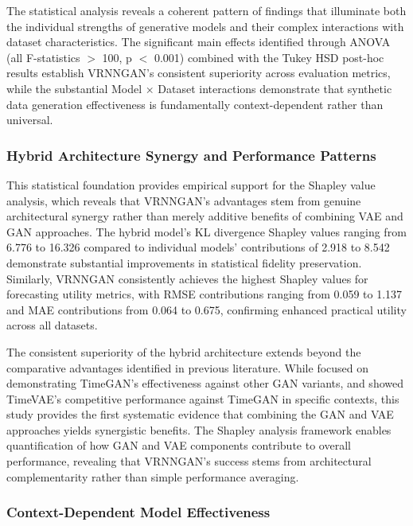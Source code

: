 \documentclass{article}
\begin{document}
The statistical analysis reveals a coherent pattern of findings that illuminate both the individual strengths of generative models and their complex interactions with dataset characteristics. The significant main effects identified through ANOVA (all F-statistics $>$ 100, p $<$ 0.001) combined with the Tukey HSD post-hoc results establish VRNNGAN's consistent superiority across evaluation metrics, while the substantial Model × Dataset interactions demonstrate that synthetic data generation effectiveness is fundamentally context-dependent rather than universal.

\subsubsection*{Hybrid Architecture Synergy and Performance Patterns}

This statistical foundation provides empirical support for the Shapley value analysis, which reveals that VRNNGAN's advantages stem from genuine architectural synergy rather than merely additive benefits of combining VAE and GAN approaches. The hybrid model's KL divergence Shapley values ranging from 6.776 to 16.326 compared to individual models' contributions of 2.918 to 8.542 demonstrate substantial improvements in statistical fidelity preservation. Similarly, VRNNGAN consistently achieves the highest Shapley values for forecasting utility metrics, with RMSE contributions ranging from 0.059 to 1.137 and MAE contributions from 0.064 to 0.675, confirming enhanced practical utility across all datasets.

The consistent superiority of the hybrid architecture extends beyond the comparative advantages identified in previous literature. While \textcite{yoon_time-series_2019} focused on demonstrating TimeGAN's effectiveness against other GAN variants, and \textcite{desai_timevae_2021} showed TimeVAE's competitive performance against TimeGAN in specific contexts, this study provides the first systematic evidence that combining the GAN and VAE approaches yields synergistic benefits. The Shapley analysis framework enables quantification of how GAN and VAE components contribute to overall performance, revealing that VRNNGAN's success stems from architectural complementarity rather than simple performance averaging.

\subsubsection*{Context-Dependent Model Effectiveness}
\end{document}
